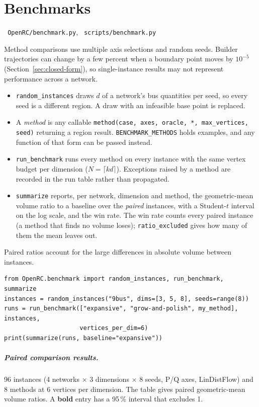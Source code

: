 \documentclass[11pt,a4paper]{report}
\newcommand{\code}[1]{\texttt{\small #1}}
\newcommand{\file}[1]{\texttt{\small\color{nbgrey} #1}}
\begin{document}
\chapter{Benchmarks}
\label{sec:benchmark}

\file{OpenRC/benchmark.py}, \file{scripts/benchmark.py}

Method comparisons use multiple axis selections and random seeds. Builder
trajectories can change by a few percent when a boundary point moves by
$10^{-5}$ (Section~\ref{sec:closed-form}), so single-instance results may not
represent performance across a network.
\begin{itemize}[itemsep=0.1em]
\item \code{random\_instances} draws $d$ of a network's bus quantities per
  seed, so every seed is a different region. A draw with an infeasible base
  point is replaced.
\item A \emph{method} is any callable
  \code{method(case, axes, oracle, *, max\_vertices, seed)} returning a
  region result. \code{BENCHMARK\_METHODS} holds examples, and any function of
  that form can be passed instead.
\item \code{run\_benchmark} runs every method on every instance with the same
  vertex budget per dimension ($N = \lceil k d \rceil$). Exceptions raised by a
  method are recorded in the run table rather than propagated.
\item \code{summarize} reports, per network, dimension and method, the
  geometric-mean volume ratio to a baseline over the \emph{paired} instances,
  with a Student-$t$ interval on the log scale, and the win rate. The win
  rate counts every paired instance (a method that finds no volume loses);
  \code{ratio\_excluded} gives how many of them the mean leaves out.
\end{itemize}
Paired ratios account for the large differences in absolute volume between
instances.

\begin{lstlisting}
from OpenRC.benchmark import random_instances, run_benchmark, summarize
instances = random_instances("9bus", dims=[3, 5, 8], seeds=range(8))
runs = run_benchmark(["expansive", "grow-and-polish", my_method], instances,
                     vertices_per_dim=6)
print(summarize(runs, baseline="expansive"))
\end{lstlisting}

\paragraph{Paired comparison results.} 96 instances (4 networks $\times$
3 dimensions $\times$ 8 seeds, P/Q axes, LinDistFlow) and 8 methods at
6 vertices per dimension. The table gives
paired geometric-mean volume ratios. A \textbf{bold} entry has a 95\,\%
interval that excludes 1.
\end{document}
